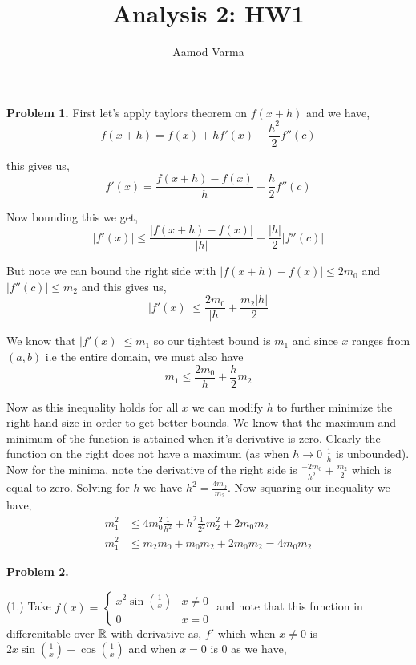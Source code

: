 \documentclass[a4paper]{article}
\title{Analysis 2: HW1}
\author{Aamod Varma}
\begin{document}
\maketitle
\textbf{Problem 1.}
First let's apply taylors theorem on $f(x + h)$ and we have, 
\[
    f(x + h) = f(x) + hf'(x) + \frac{h^2}{2}f''(c)
\]

this gives us, 
\[
    f'(x) = \frac{f(x + h) -f(x)}{h} - \frac{h}{2}f''(c)
\]

Now bounding this we get, 
\[
    |f'(x)| \le \frac{|f(x + h) - f(x)|}{|h|} + \frac{|h|}{2}|f''(c)|
\]

But note we can bound the right side with $|f(x + h) - f(x)| \le 2m_{0}$ and $|f''(c) | \le m_{2}$ and this gives us, 
\[
    |f'(x)| \le \frac{2m_{0}}{|h|} + \frac{m_{2}|h|}{2}
\]

We know that $|f'(x)| \le m_{1}$ so our tightest bound is $m_{1}$ and since $x$ ranges from $(a, b)$ i.e the entire domain, we must also have $$m_{1} \le \frac{2m_{0}}{h} + \frac{h}{2}m_{2}$$

Now as this inequality holds for all $x$ we can modify $h$ to further minimize the right hand size in order to get better bounds. We know that the maximum and minimum of the function is attained when it's derivative is zero. Clearly the function on the right does not have a maximum (as when $h \to 0$ $\frac{1}{h}$ is unbounded). Now for the minima, note the derivative of the right side is $\frac{-2m_{0}}{h^2} + \frac{m_{2}}{2}$ which is equal to zero. Solving for $h$ we have $h^2 = \frac{4m_{0}}{ m_{2}}$. Now squaring our inequality we have, 
\begin{align*}
    m_{1}^2 &\le 4m_{0}^2 \frac{1}{h^2} + h^2 \frac{1}{2^2} m_{2}^2 + 2m_{0}m_{2}\\
    m_{1}^2  &\le m_{2}m_{0}  +m_{0}m_{2} + 2m_{0}m_{2} = 4m_{0}m_{2}
\end{align*}





\textbf{Problem 2.}
\vspace{1em}

(1.) Take $f(x) = \begin{cases}
    x^2 \sin\left(\frac{1}{x} \right) & x \ne 0\\
    0 & x = 0
\end{cases}$ and note that this function in differenitable over $\mathbb{R}$ with derivative as, $f'$ which when $x \ne 0$ is $2x \sin \left ( \frac{1}{x}\right ) - \cos \left ( \frac{1}{x}\right )$  and when $x = 0$ is $0$ as we have, 
\end{document}
